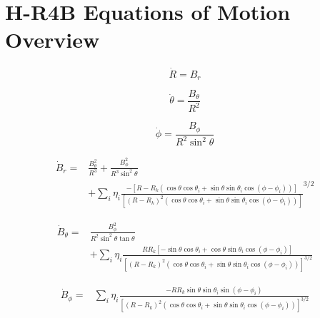 \chapter{H-R4B Equations of Motion Overview} \label{apx:hcr4b-overview}

\begin{equation} \tag{2.67}
    \boxed{
            \dot{R} = B_r
    }
\end{equation}


\begin{equation} \tag{2.72}
    \boxed{
            \dot{\theta} = \frac{B_\theta}{R^2}
    }
\end{equation}


\begin{equation} \tag{2.76}
    \boxed{
            \dot{\phi} = \frac{B_\phi}{R^2 \sin^2{\theta}}
    }
\end{equation}


\begin{equation} \tag{2.86}
    \boxed{
        \!\begin{aligned}
        \dot{B}_r = &\frac{B_\theta^2}{R^3} + \frac{B_\phi^2}{R^3 \sin^2{\theta}} \\
        & + \sum\limits_{i} \eta_i \frac{-\left[R - R_k \left(\cos{\theta}\cos{\theta_i} + \sin{\theta}\sin{\theta_i}\cos{(\phi - \phi_i)}\right) \right]}{\left[(R - R_k)^2 \left(\cos{\theta}\cos{\theta_i} + \sin{\theta}\sin{\theta_i}\cos{(\phi - \phi_i)} \right) \right]}^{3/2}
        \end{aligned}
    }
\end{equation}


\begin{equation} \tag{2.87}
    \boxed{
        \!\begin{aligned}
            \dot{B}_\theta = &\frac{B_\phi^2}{R^2 \sin^2{\theta} \tan{\theta}} \\
            &+ \sum\limits_{i} \eta_i \frac{R R_k \left[-\sin{\theta}\cos{\theta_i} + \cos{\theta}\sin{\theta_i}\cos{(\phi - \phi_i)} \right]}{\left[(R - R_k)^2 \left(\cos{\theta}\cos{\theta_i} + \sin{\theta}\sin{\theta_i}\cos{(\phi - \phi_i)} \right) \right]^{3/2}}
        \end{aligned}
    }
\end{equation}


\begin{equation} \tag{2.88}
    \boxed{
        \!\begin{aligned}
            \dot{B}_\phi = &\sum\limits_{i} \eta_i \frac{- R R_k \sin{\theta}\sin{\theta_i}\sin{(\phi - \phi_i)}}{\left[(R - R_k)^2 \left(\cos{\theta}\cos{\theta_i} + \sin{\theta}\sin{\theta_i}\cos{(\phi - \phi_i)} \right) \right]^{3/2}}
        \end{aligned}
    }
\end{equation}
